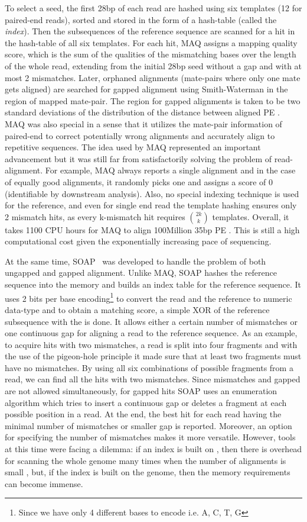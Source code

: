 To select a seed, the first 28bp of each read are hashed using six templates (12 for paired-end reads), sorted and stored in the form of a hash-table (called the \textit{index}). Then the subsequences of the reference sequence are scanned for a hit in the hash-table of all six templates. For each hit, MAQ assigns a mapping quality score, which is the sum of the qualities of the mismatching bases over the length of the whole read, extending from the initial 28bp seed without a gap and with at most 2 mismatches. Later, orphaned alignments (mate-pairs where only one mate gets aligned) are searched for gapped alignment using Smith-Waterman in the region of mapped mate-pair. The region for gapped alignments is taken to be two standard deviations of the distribution of the distance between aligned PE \reads. MAQ was also special in a sense that it utilizes the mate-pair information of paired-end \reads to correct potentially wrong alignments and accurately align \reads to repetitive sequences. The idea used by MAQ represented an important advancement but it was still far from satisfactorily solving the problem of read-alignment. For example, MAQ always reports a single alignment and in the case of equally good alignments, it randomly picks one and assigns a score of 0 (identifiable by downstream analysis). Also, no special indexing technique is used for the reference, and even for single end read the template hashing ensures only 2 mismatch hits, as every k-mismatch hit requires $\binom{2k}{k}$ templates. Overall, it takes 1100 CPU hours for MAQ to align 100Million 35bp PE \reads . This is still a high computational cost given the exponentially increasing pace of sequencing.

At the same time, SOAP~\citep{li2008soap} was developed to handle the problem of both ungapped and gapped alignment. Unlike MAQ, SOAP hashes the reference sequence into the memory and builds an index table for the reference sequence. It uses 2 bits per base encoding\footnote{Since we have only 4 different bases to encode i.e. A, C, T, G} to convert the read and the reference to numeric data-type and to obtain a matching score, a simple XOR of the reference subsequence with the \reads is done. It allows either a certain number of mismatches or one continuous gap for aligning a read to the reference sequence. As an example, to acquire hits with two mismatches, a read is split into four fragments and with the use of the pigeon-hole principle it made sure that at least two fragments must have no mismatches. By using all six combinations of possible fragments from a read, we can find all the hits with two mismatches. Since mismatches and gapped are not allowed simultaneously, for gapped hits SOAP uses an enumeration algorithm which tries to insert a continuous gap or deletes a fragment at each possible position in a read. At the end, the best hit for each read having the minimal number of mismatches or smaller gap is reported.  Moreover, an option for specifying the number of mismatches makes it more versatile. However, tools at this time were facing a dilemma: if an index is built on \reads, then there is overhead for scanning the whole genome many times when the number of alignments is small , but, if the index is built on the genome, then the memory requirements can become immense.

